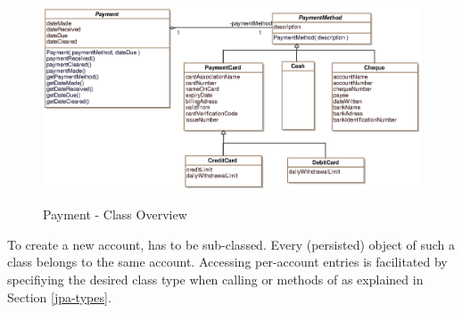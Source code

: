 \begin{figure}
\centering
  \includegraphics[width=1.0\textwidth]{images/Payment_Overview.eps}
	\label{payment_overview}
	\caption{Payment - Class Overview}
\end{figure}

To create a new account,  has to be sub-classed.
Every (persisted) object of such a class belongs to the same account.
Accessing per-account entries is facilitated by specifiying the desired class type when calling  or  methods of  as explained in Section \ref{jpa-types}.
